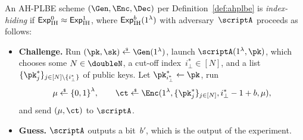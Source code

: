 \begin{definition}\label{def:ahplbe-index-hiding}
An AH-PLBE scheme $(\Gen,\Enc,\Dec)$ per Definition~\ref{def:ahplbe}
is \emph{index-hiding} if ${\ExpIH{0}\approx\ExpIH{1}}$,
where $\ExpIH{b}(1^\lambda)$ with adversary~$\scriptA$ proceeds as follows:
\begin{itemize}\upshape
\item\textbf{Challenge.}
Run
${(\pk,\sk)\draws\Gen(1^\lambda)}$,
launch $\scriptA(1^\lambda,\pk)$,
which chooses
some ${N\in\doubleN}$,
a cut-off index~${i_\bot^\ast\in[N]}$, and
a list~$\{\pk^\ast_j\}_{j\in[N]\setminus\{i_\bot^\ast\}}$ of public keys.
Let ${\pk^\ast_{i_\bot^\ast}\gets\pk}$,
run
\begin{align*}
\mu\draws\bit^\lambda,\qquad
\ct\draws\Enc(1^\lambda,\{\pk^\ast_j\}_{j\in[N]},i_\bot^\ast-1+b,\mu),
\end{align*}
and send $(\mu,\ct)$ to $\scriptA$.
\item\textbf{Guess.}
$\scriptA$ outputs a bit~$b'$, which is the output of the experiment.
\end{itemize}
\end{definition}
